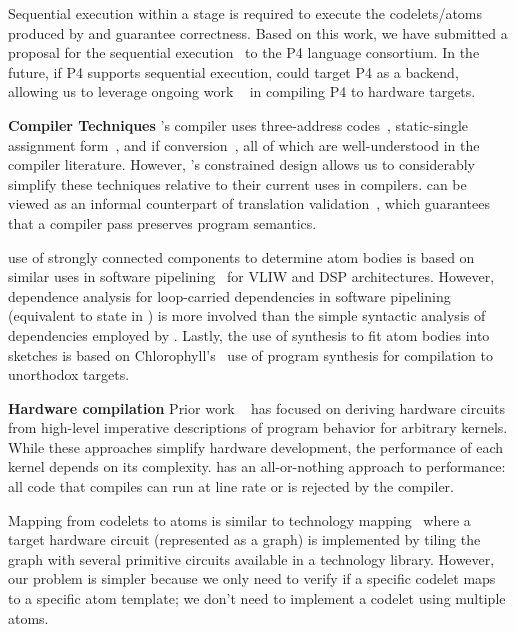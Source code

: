 Sequential execution within a stage is required to execute the codelets/atoms
produced by \pktlanguage and guarantee correctness. Based on this work, we have
submitted a proposal for the sequential execution~\cite{p4-semantics} to the P4
language consortium. In the future, if P4 supports sequential execution,
\pktlanguage could target P4 as a backend, allowing us to leverage ongoing work
~\cite{netronome, xilinx,lavanya_compiler} in compiling P4 to hardware targets.

\textbf{Compiler Techniques}
\pktlanguage's compiler uses three-address codes~\cite{tac}, static-single
assignment form~\cite{ssa}, and if conversion~\cite{if_conversion}, all of
which are well-understood in the compiler literature. However, \pktlanguage's
constrained design allows us to considerably simplify these techniques relative
to their current uses in compilers. \tester can be viewed as an informal
counterpart of translation validation~\cite{necula_translation_validation},
which guarantees that a compiler pass preserves program semantics.

\pktlanguage use of strongly connected components to determine atom bodies is
based on similar uses in software pipelining~\cite{software_pipelining} for
VLIW and DSP architectures. However, dependence analysis for loop-carried
dependencies in software pipelining (equivalent to state in \pktlanguage) is
more involved than the simple syntactic analysis of dependencies employed by
\pktlanguage. Lastly, the use of synthesis to fit atom bodies into sketches is
based on Chlorophyll's~\cite{chlorophyll} use of program synthesis for
compilation to unorthodox targets.

\textbf{Hardware compilation}
Prior work ~\cite{nurvadathi, cash, bluespec} has focused on deriving hardware
circuits from high-level imperative descriptions of program behavior for
arbitrary kernels. While these approaches simplify hardware development, the
performance of each kernel depends on its complexity.  \pktlanguage has an
all-or-nothing approach to performance: all code that compiles can run at
line rate or is rejected by the compiler.

Mapping from codelets to atoms is similar to technology mapping~\cite{micheli,
flowmap, spectransform} where a target hardware circuit (represented as a
graph) is implemented by tiling the graph with several primitive circuits
available in a technology library. However, our problem is simpler because we
only need to verify if a specific codelet maps to a specific atom template; we
don't need to implement a codelet using multiple atoms.
